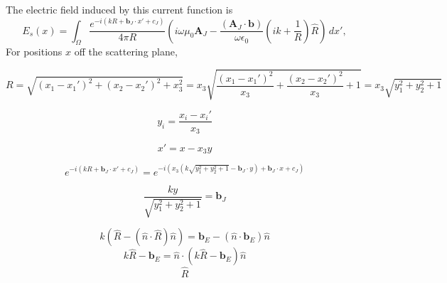 \documentclass{article}
\theoremstyle{plain}
\begin{document}
The electric field induced by this current function is 
\begin{equation}
	E_s(x)
	= \int_\Omega \frac{e^{-i(kR+\mathbf{b}_J\cdot x' + c_J)}}{4\pi R}
	\left( i\omega\mu_0 \mathbf{A}_J
	- \frac{(\mathbf{A}_J\cdot\mathbf{b})}{\omega\epsilon_0}\left( ik + \frac{1}{R} \right) \hat{R} \right) \,dx',
\end{equation}
For positions $x$ off the scattering plane, 











\begin{equation}
	R = \sqrt{ \left(x_1-x_1'\right)^2 + \left(x_2-x_2'\right)^2 + x_3^2 }
	= x_3\sqrt{ \frac{\left(x_1-x_1'\right)^2}{x_3} + \frac{\left(x_2-x_2'\right)^2}{x_3} + 1 }
	= x_3\sqrt{ y_1^2 + y_2^2 + 1 }
\end{equation}

\begin{equation}
	y_i = \frac{x_i-x_i'}{x_3}
\end{equation}

\begin{equation}
	x' = x - x_3y
\end{equation}

\begin{equation}
	e^{-i(kR+\mathbf{b}_J\cdot x' + c_J)}
	= e^{-i\left(x_3\left(k\sqrt{ y_1^2 + y_2^2 + 1 }-\mathbf{b}_J\cdot y\right) + \mathbf{b}_J\cdot x + c_J \right)}
\end{equation}

\begin{equation}
	\frac{ky}{\sqrt{ y_1^2 + y_2^2 + 1 }} = \mathbf{b}_J
\end{equation}

\begin{equation}
	k(\hat{R} - (\hat{n}\cdot\hat{R})\hat{n}) = \mathbf{b}_E - (\hat{n}\cdot\mathbf{b}_E)\hat{n}
\end{equation}
\begin{equation}
	k\hat{R} - \mathbf{b}_E = \hat{n}\cdot\left( k\hat{R} - \mathbf{b}_E \right)\hat{n}
\end{equation}
\begin{equation}
	\hat{R} 
\end{equation}


\end{document}
